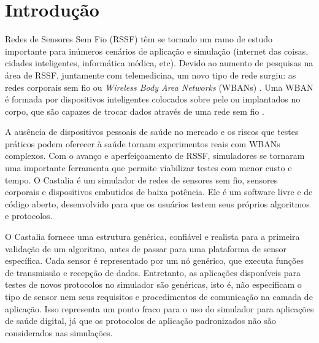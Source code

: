 \section{Introdução}\label{introduction}

Redes de Sensores Sem Fio (RSSF) têm se tornado um ramo de estudo importante para inúmeros cenários de aplicação e simulação (internet das coisas, cidades inteligentes, informática médica, etc). Devido ao aumento de pesquisas na área de RSSF, juntamente com telemedicina, um novo tipo de rede surgiu: as redes corporais sem fio ou \textit{Wireless Body Area Networks} (WBANs) \cite{b21}. Uma WBAN é formada por dispositivos inteligentes colocados sobre pele ou implantados no corpo, que são capazes de trocar dados através de uma rede sem fio \cite{b18}. 

A ausência de dispositivos pessoais de saúde no mercado e os riscos que testes práticos podem oferecer à saúde tornam experimentos reais com WBANs complexos. Com o avanço e aperfeiçoamento de RSSF, simuladores se tornaram uma importante ferramenta que permite viabilizar testes com menor custo e tempo. O Castalia \cite{b15} é um simulador de redes de sensores sem fio, sensores corporais e dispositivos embutidos de baixa potência. Ele é um software livre e de código aberto, desenvolvido para que os usuários testem seus próprios algoritmos e protocolos.

O Castalia fornece uma estrutura genérica, confiável e realista para a primeira validação de um algoritmo, antes de passar para uma plataforma de sensor específica. Cada sensor é representado por um nó genérico, que executa funções de transmissão e recepção de dados. Entretanto, as aplicações disponíveis para testes de novos protocolos no simulador são genéricas, isto é, não especificam o tipo de sensor nem seus requisitos e procedimentos de comunicação na camada de aplicação. Isso representa um ponto fraco para o uso do simulador para aplicações de saúde digital, já que os protocolos de aplicação padronizados não são considerados nas simulações.

